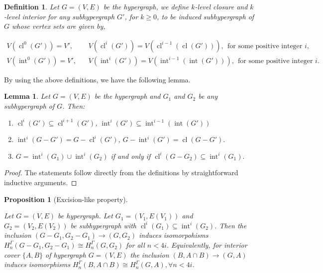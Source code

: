\documentclass[10pt,a4paper]{amsart}
\newtheorem{Def}[subsection]{Definition}
\newtheorem{prop}[subsection]{Proposition}
\newtheorem{lem}[subsection]{Lemma}
\newcommand{\cl}{\operatorname{cl}}
\renewcommand{\int}{\operatorname{int}}
\begin{document}
\begin{Def}
Let $G=(V,E)$ be the hypergraph, we define $k$-level closure and $k$-level interior for any subhypergraph $G'$, for $k\ge 0$, to be induced subhypergraph of $G$ whose vertex sets are given by, 

\begin{equation*} \begin{split}
    V(\cl^0(G'))=V', & ~~~~ V(\cl^{i}(G')) = V(\cl^{i-1}(\cl(G'))), ~~\text{for some positive integer } i,\\
V(\int^0(G')) =V', & ~~~~ V(\int^i(G'))=V(\int^{i-1}(\int(G'))), ~~ \text{for some positive integer } i.\end{split}
\end{equation*}

\medskip

\end{Def}
By using the above definitions, we have the following lemma.
\begin{lem}\label{iterative int and cl}
Let $G=(V, E)$ be the hypergraph and $G_1$ and $G_2$ be any subhypergraph of $G$. Then:
\begin{enumerate}
	\item ${\cl^{i}(G')} \subseteq {\cl^{i+1}(G')}$, $\int^{i}(G')\subseteq \int^{i-1}(\int(G'))$
	\item  $\int^i(G-G')=G-\cl^i(G')$, $G-\int^i(G')=\cl(G-G').$
	\item $G=\int^i(G_1)\cup \int^i(G_2)$ if and only if $\cl^i(G-G_2)\subseteq \int^i(G_1).$
\end{enumerate}
\end{lem}

\begin{proof}
The statements follow directly from the definitions by straightforward inductive arguments.
\end{proof}


\begin{prop}[Excision-like property]\label{gamma excion-like}

Let $G=(V,E)$ be hypergraph. Let $G_1=(V_1,E(V_1))$ and $G_2=(V_2,E(V_2))$ be subhypergraph with $\cl^i(G_1)\subseteq \int^i(G_2)$. Then the inclusion $(G-G_1,G_2-G_1)\rightarrow (G,G_2)$ induces isomorpohisms $H_{n}^\Gamma(G-G_1,G_2-G_1)\cong H_{n}^\Gamma(G,G_2)$ for all $n< 4i$. Equivalently, for interior cover $\{A,B\}$ of hypergraph $G=(V,E)$ the inclusion $(B,A\cap B)\rightarrow (G,A)$ induces isomorphisms $H_{n}^\Gamma(B,A\cap B)\cong H_{n}^\Gamma(G,A), \forall n<4i$.
\end{prop}
\end{document}
